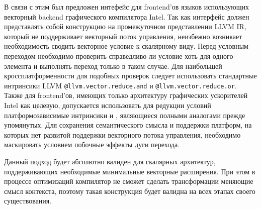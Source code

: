 В связи с этим был предложен интефейс для frontend'ов языков использующих
векторный backend графического компилятора Intel. Так как интерфейс должен
представлять собой конструкцию на промежуточном
представлении LLVM IR, который не поддерживает векторный поток управления,
неизбежно возникает необходимость сводить векторное условие к скалярному виду.
Перед условным переходом необходимо проверить справедливо ли условие хоть для
одного элемента и выполнять переход только в таком случае. Для наибольшей
кроссплатформенности для подобных проверок следует использовать стандартные
интринсики LLVM \texttt{@llvm.vector.reduce.and} и
\texttt{@llvm.vector.reduce.or}. Также для frontend'ов, имеющих только
архитектуру графических ускорителей Intel как
целевую, допускается использовать для редукции условий платформозависимые
интринсики  и , являющиеся полными
аналогами прежде упомянутых. Для сохранения семантического смысла и
поддержки платформ, на которых нет развитой поддержки векторного потока
управления, необходимо маскировать условием побочные эффекты дуги перехода.

Данный подход будет абсолютно валиден для скалярных архитектур, поддерживающих
необходимые минимальные векторные расширения. При этом в процессе оптимизаций
компилятор не сможет сделать трансформации меняющие смысл контекста, поэтому
такая конструкция будет валидна на всех этапах своего существования.
